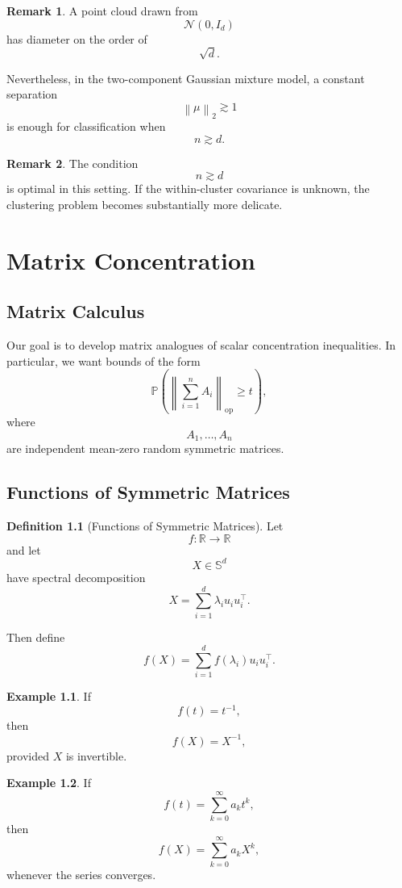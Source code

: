 \documentclass[12pt,oneside]{book}
\numberwithin{equation}{section}
\theoremstyle{definition}
\newtheorem{definition}{Definition}[section]
\newtheorem{example}{Example}[section]
\newtheorem{remark}{Remark}[section]
\theoremstyle{plain}
\theoremstyle{remark}
\newcommand{\R}{\mathbb{R}}
\newcommand{\Prob}{\mathbb{P}}
\newcommand{\norm}[1]{\left\lVert #1 \right\rVert}
\newcommand{\Normal}{\mathcal{N}}
\begin{document}
\begin{remark}
A point cloud drawn from
\[
\Normal(0,I_d)
\]
has diameter on the order of
\[
\sqrt{d}.
\]

Nevertheless, in the two-component Gaussian mixture model, a constant separation
\[
\norm{\mu}_2\gtrsim 1
\]
is enough for classification when
\[
n\gtrsim d.
\]
\end{remark}

\begin{remark}
The condition
\[
n\gtrsim d
\]
is optimal in this setting. If the within-cluster covariance is unknown, the clustering problem becomes substantially more delicate.
\end{remark}

\chapter{Matrix Concentration}

\section{Matrix Calculus}

Our goal is to develop matrix analogues of scalar concentration inequalities. In particular, we want bounds of the form
\[
\Prob\left(
\norm{\sum_{i=1}^n A_i}_{\mathrm{op}}\geq t
\right),
\]
where
\[
A_1,\dots,A_n
\]
are independent mean-zero random symmetric matrices.

\section{Functions of Symmetric Matrices}

\begin{definition}[Functions of Symmetric Matrices]
Let
\[
f:\R\to\R
\]
and let
\[
X\in\mathbb{S}^d
\]
have spectral decomposition
\[
X=\sum_{i=1}^d \lambda_i u_i u_i^\top.
\]

Then define
\[
f(X)
=
\sum_{i=1}^d f(\lambda_i)u_i u_i^\top.
\]
\end{definition}

\begin{example}
If
\[
f(t)=t^{-1},
\]
then
\[
f(X)=X^{-1},
\]
provided $X$ is invertible.
\end{example}

\begin{example}
If
\[
f(t)=\sum_{k=0}^{\infty} a_k t^k,
\]
then
\[
f(X)=\sum_{k=0}^{\infty} a_k X^k,
\]
whenever the series converges.
\end{example}
\end{document}
